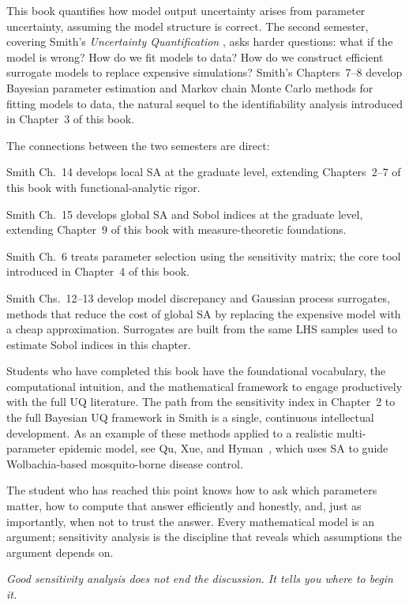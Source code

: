 This book quantifies how model output uncertainty arises from
parameter uncertainty, assuming the model structure is correct.
The second semester, covering Smith's \emph{Uncertainty Quantification}
\cite{smith2014uncertainty}, asks harder questions: what if the model is wrong?
How do we fit models to data? How do we construct efficient surrogate
models to replace expensive simulations?
Smith's Chapters~7--8 develop Bayesian parameter estimation and Markov chain
Monte Carlo methods for fitting models to data, the natural sequel to the
identifiability analysis introduced in Chapter~3 of this book.

The connections between the two semesters are direct:

Smith Ch.~14 develops local SA at the graduate level, extending
Chapters~2--7 of this book with functional-analytic rigor.

Smith Ch.~15 develops global SA and Sobol indices at the graduate level,
extending Chapter~9 of this book with measure-theoretic foundations.

Smith Ch.~6 treats parameter selection using the sensitivity matrix;
the core tool introduced in Chapter~4 of this book.

Smith Chs.~12--13 develop model discrepancy and Gaussian process
surrogates, methods that reduce the cost of global SA by replacing
the expensive model with a cheap approximation. Surrogates are
built from the same LHS samples used to estimate Sobol indices
in this chapter.

Students who have completed this book have the foundational vocabulary,
the computational intuition, and the mathematical framework to engage
productively with the full UQ literature. The path from the sensitivity
index in Chapter~2 to the full Bayesian UQ framework in Smith is
a single, continuous intellectual development. As an example of
these methods applied to a realistic multi-parameter epidemic model,
see Qu, Xue, and Hyman~\cite{qu2018modeling}, which uses SA to
guide Wolbachia-based mosquito-borne disease control.

The student who has reached this point knows how to ask which parameters
matter, how to compute that answer efficiently and honestly, and, just
as importantly, when not to trust the answer.
Every mathematical model is an argument; sensitivity analysis is the
discipline that reveals which assumptions the argument depends on.

\medskip\noindent
\textit{Good sensitivity analysis does not end the discussion.
It tells you where to begin it.}

